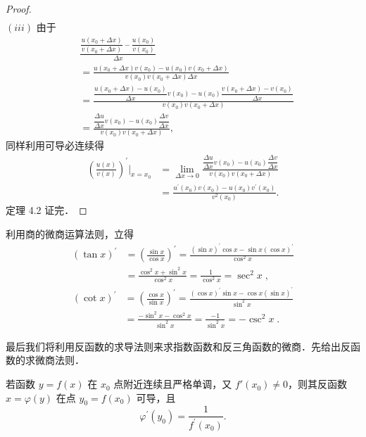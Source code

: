 \begin{proof}
\[\begin{aligned}
\end{aligned}
\]
$(iii)$ 由于
\[
\begin{aligned}
&\frac{\dfrac{u(x_0+\Delta x)}{v(x_0+\Delta x)} - \dfrac{u(x_0)}{v(x_0)}}{\Delta x}\\
&= \frac{u\left(x_0+\Delta x\right)v\left(x_0\right) - u\left(x_0\right)v\left(x_0+\Delta x\right)}{v\left(x_0\right)v\left(x_0+\Delta x\right)\Delta x}\\
&= \frac{\dfrac{u\left(x_0+\Delta x\right) - u\left(x_0\right)}{\Delta x}v\left(x_0\right) - u\left(x_0\right)\dfrac{v\left(x_0+\Delta x\right) - v\left(x_0\right)}{\Delta x}}{v\left(x_0\right)v\left(x_0+\Delta x\right)}\\
&= \frac{\dfrac{\Delta u}{\Delta x}v\left(x_0\right) - u\left(x_0\right)\dfrac{\Delta v}{\Delta x}}{v\left(x_0\right)v\left(x_0+\Delta x\right)},
\end{aligned}
\]
同样利用可导必连续得
\[
\begin{aligned}
\left(\frac{u\left(x\right)}{v\left(x\right)}\right)^{\prime}\bigg|_{x=x_0} &= \lim_{\Delta x\to 0}\frac{\dfrac{\Delta u}{\Delta x}v\left(x_0\right) - u\left(x_0\right)\dfrac{\Delta v}{\Delta x}}{v\left(x_0\right)v\left(x_0+\Delta x\right)}\\
&= \frac{u^{\prime}\left(x_0\right)v\left(x_0\right) - u\left(x_0\right)v^{\prime}\left(x_0\right)}{v^{2}\left(x_0\right)}.
\end{aligned}
\]
定理 4.2 证完．
\end{proof}

利用商的微商运算法则，立得
\[
\begin{aligned}
(\tan x)^{\prime} &= \left(\frac{\sin x}{\cos x}\right)^{\prime} = \frac{(\sin x)^{\prime}\cos x - \sin x(\cos x)^{\prime}}{\cos^{2}x}\\
&= \frac{\cos^{2}x + \sin^{2}x}{\cos^{2}x} = \frac{1}{\cos^{2}x} = \sec^{2}x\;,
\end{aligned}
\]
\[
\begin{aligned}
\left(\cot x\right)^{\prime} &= \left(\frac{\cos x}{\sin x}\right)^{\prime} = \frac{\left(\cos x\right)^{\prime}\sin x - \cos x\left(\sin x\right)^{\prime}}{\sin^{2}x}\\
&= \frac{-\sin^{2}x - \cos^{2}x}{\sin^{2}x} = \frac{-1}{\sin^{2}x} = -\csc^{2}x\;.
\end{aligned}
\]

最后我们将利用反函数的求导法则来求指数函数和反三角函数的微商．先给出反函数的求微商法则．

\begin{theorem}\label{thm:4-3}
若函数 $y = f(x)$ 在 $x_0$ 点附近连续且严格单调，又 $f'(x_0) \neq 0$，则其反函数 $x = \varphi(y)$ 在点 $y_0 = f(x_0)$ 可导，且
\[
\varphi^{\prime}\left(y_0\right) = \frac{1}{f^{\prime}\left(x_0\right)}.
\]
\end{theorem}

